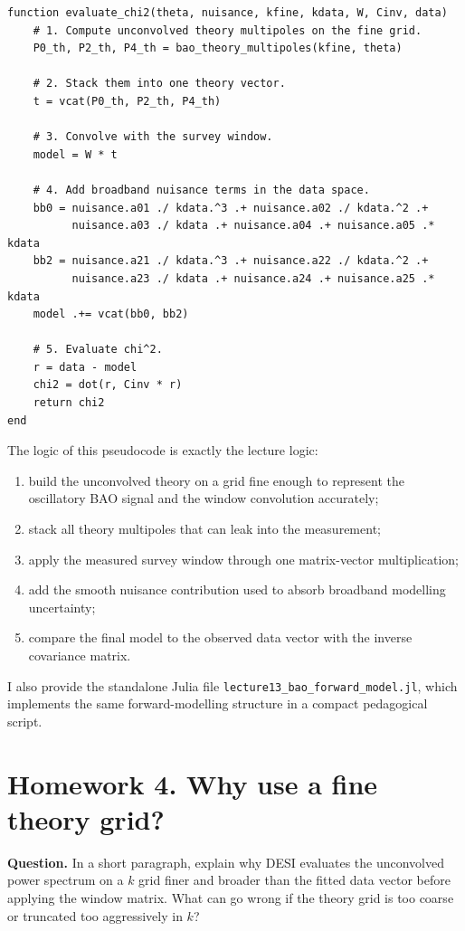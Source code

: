 \documentclass[11pt]{article}
\begin{document}
\begin{lstlisting}
function evaluate_chi2(theta, nuisance, kfine, kdata, W, Cinv, data)
    # 1. Compute unconvolved theory multipoles on the fine grid.
    P0_th, P2_th, P4_th = bao_theory_multipoles(kfine, theta)

    # 2. Stack them into one theory vector.
    t = vcat(P0_th, P2_th, P4_th)

    # 3. Convolve with the survey window.
    model = W * t

    # 4. Add broadband nuisance terms in the data space.
    bb0 = nuisance.a01 ./ kdata.^3 .+ nuisance.a02 ./ kdata.^2 .+
          nuisance.a03 ./ kdata .+ nuisance.a04 .+ nuisance.a05 .* kdata
    bb2 = nuisance.a21 ./ kdata.^3 .+ nuisance.a22 ./ kdata.^2 .+
          nuisance.a23 ./ kdata .+ nuisance.a24 .+ nuisance.a25 .* kdata
    model .+= vcat(bb0, bb2)

    # 5. Evaluate chi^2.
    r = data - model
    chi2 = dot(r, Cinv * r)
    return chi2
end
\end{lstlisting}

The logic of this pseudocode is exactly the lecture logic:
\begin{enumerate}[leftmargin=*]
    \item build the unconvolved theory on a grid fine enough to represent the oscillatory BAO signal and the window convolution accurately;
    \item stack all theory multipoles that can leak into the measurement;
    \item apply the measured survey window through one matrix-vector multiplication;
    \item add the smooth nuisance contribution used to absorb broadband modelling uncertainty;
    \item compare the final model to the observed data vector with the inverse covariance matrix.
\end{enumerate}
I also provide the standalone Julia file \texttt{lecture13\_bao\_forward\_model.jl}, which implements the same forward-modelling structure in a compact pedagogical script.

\section*{Homework 4. Why use a fine theory grid?}
\textbf{Question.} In a short paragraph, explain why DESI evaluates the unconvolved power spectrum on a $k$ grid finer and broader than the fitted data vector before applying the window matrix. What can go wrong if the theory grid is too coarse or truncated too aggressively in $k$?
\end{document}
